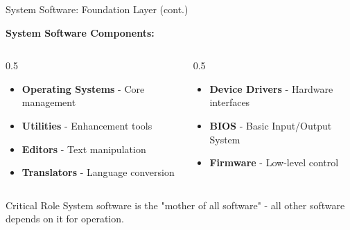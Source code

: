\documentclass[aspectratio=169]{beamer}
\begin{document}
\begin{frame}{System Software: Foundation Layer (cont.)}
   
    \textbf{System Software Components:}
    \begin{columns}
        \begin{column}{0.5\textwidth}
            \begin{itemize}
                \item \textbf{Operating Systems} - Core management
                \item \textbf{Utilities} - Enhancement tools
                \item \textbf{Editors} - Text manipulation
                \item \textbf{Translators} - Language conversion
            \end{itemize}
        \end{column}
        \begin{column}{0.5\textwidth}
            \begin{itemize}
                \item \textbf{Device Drivers} - Hardware interfaces
                \item \textbf{BIOS} - Basic Input/Output System
                \item \textbf{Firmware} - Low-level control
            \end{itemize}
        \end{column}
    \end{columns}
    
    \begin{alertblock}{Critical Role}
        System software is the "mother of all software" - all other software depends on it for operation.
    \end{alertblock}
\end{frame}
\end{document}
